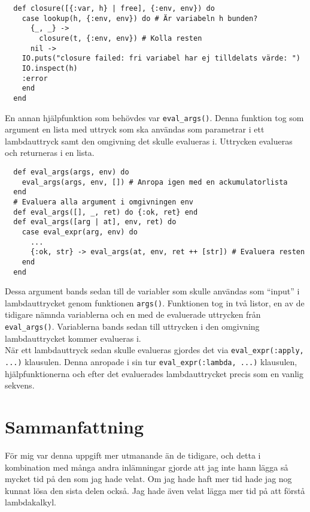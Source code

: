 \documentclass[a4paper,11pt]{article}
\begin{document}
\begin{verbatim}
  def closure([{:var, h} | free], {:env, env}) do
    case lookup(h, {:env, env}) do # Är variabeln h bunden?
      {_, _} ->
        closure(t, {:env, env}) # Kolla resten
      nil ->
	IO.puts("closure failed: fri variabel har ej tilldelats värde: ")
	IO.inspect(h)
	:error
    end
  end
\end{verbatim}
En annan hjälpfunktion som behövdes var {\tt eval\_args()}. Denna funktion tog som argument en lista med uttryck som ska användas som parametrar i ett lambdauttryck samt den omgivning det skulle evalueras i. Uttrycken evalueras och returneras i en lista.
\begin{verbatim}
  def eval_args(args, env) do
    eval_args(args, env, []) # Anropa igen med en ackumulatorlista
  end
  # Evaluera alla argument i omgivningen env
  def eval_args([], _, ret) do {:ok, ret} end
  def eval_args([arg | at], env, ret) do
    case eval_expr(arg, env) do
      ...
      {:ok, str} -> eval_args(at, env, ret ++ [str]) # Evaluera resten
    end
  end
\end{verbatim}
Dessa argument bands sedan till de variabler som skulle användas som ``input'' i lambdauttrycket genom funktionen {\tt args()}. Funktionen tog in två listor, en av de tidigare nämnda variablerna och en med de evaluerade uttrycken från {\tt eval\_args()}. Variablerna bands sedan till uttrycken i den omgivning lambdauttrycket kommer evalueras i.\\
När ett lambdauttryck sedan skulle evalueras gjordes det via {\tt eval\_expr(:apply, ...)} klausulen. Denna anropade i sin tur {\tt eval\_expr(:lambda, ...)} klausulen, hjälpfunktionerna och efter det evaluerades lambdauttrycket precis som en vanlig sekvens.

\section*{Sammanfattning}
För mig var denna uppgift mer utmanande än de tidigare, och detta i kombination med många andra inlämningar gjorde att jag inte hann lägga så mycket tid på den som jag hade velat. Om jag hade haft mer tid hade jag nog kunnat lösa den sista delen också. Jag hade även velat lägga mer tid på att förstå lambdakalkyl.
\end{document}
